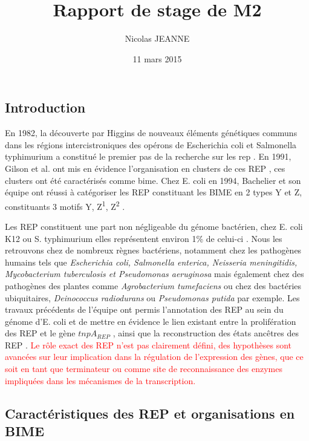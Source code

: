 \documentclass[12pt,a4paper]{report}
\author{Nicolas JEANNE}
\title{Rapport de stage de M2}
\date{11 mars 2015}
\begin{document}
\maketitle

\begin{onehalfspace}
\chapter*{Introduction}
En 1982, la découverte par Higgins de nouveaux éléments génétiques communs dans les régions intercistroniques des opérons de Escherichia coli et Salmonella typhimurium a constitué le premier pas de la recherche sur les \gls{rep} \citep{Higgins1982}. En 1991, Gilson et al. ont mis en évidence l'organisation en clusters de ces REP \citep{Gilson1991}, ces clusters ont été caractérisés comme \gls{bime}. Chez E. coli en 1994, Bachelier et son équipe ont réussi à catégoriser les REP constituant les BIME en 2 types Y et Z, constituants 3 motifs Y, Z\textsuperscript{1}, Z\textsuperscript{2}  \citep{Bachellier1994}.
 
Les REP constituent une part non négligeable du génome bactérien, chez E. coli K12 ou S. typhimurium elles représentent environ 1\% de celui-ci \citep{Gilson1991}. Nous les retrouvons chez de nombreux règnes bactériens, notamment chez les pathogènes humains tels que \textit{Escherichia coli, Salmonella enterica, Neisseria meningitidis, Mycobacterium tuberculosis et Pseudomonas aeruginosa} mais également chez des pathogènes des plantes comme \textit{Agrobacterium tumefaciens} ou chez des bactéries ubiquitaires, \textit{Deinococcus radiodurans} ou \textit{Pseudomonas putida} par exemple. Les travaux précédents de l'équipe ont permis l'annotation des REP au sein du génome d'E. coli et de mettre en évidence le lien existant entre la prolifération des REP et le gène $tnpA_{REP}$ \citep{Weyder2013,Bosc2014}, ainsi que la reconstruction des états ancêtres des REP \citep{Bosc2014}.  \textcolor{red}{Le rôle exact des REP n'est pas clairement défini, des hypothèses sont avancées sur leur implication dans la régulation de l'expression des gènes, que ce soit en tant que terminateur ou comme site de reconnaissance des enzymes impliquées dans les mécanismes de la transcription.}

\section*{Caractéristiques des REP et organisations en BIME}


\end{onehalfspace}
\end{document}
